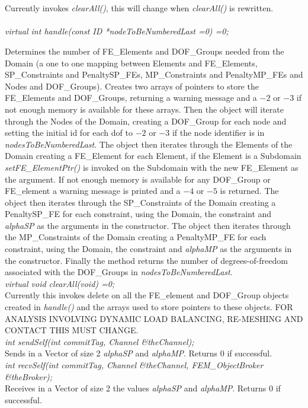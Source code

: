  \\
\\ 
Currently invokes {\em clearAll()}, this will change when {\em
clearAll()} is rewritten. \\

\\
{\em virtual int handle(const ID *nodeToBeNumberedLast =0) =0;} 

Determines the number of FE\_Elements and DOF\_Groups needed from the
Domain (a one to one mapping between Elements and FE\_Elements,
SP\_Constraints and PenaltySP\_FEs, MP\_Constraints and PenaltyMP\_FEs and
Nodes and DOF\_Groups). Creates two arrays of pointers to store the
FE\_Elements and DOF\_Groups, returning a warning message and a $-2$
or $-3$ if not enough memory is available for these arrays. Then the
object will iterate through the Nodes of the Domain, creating a
DOF\_Group for each node and setting the initial id for each dof to
$-2$ or $-3$ if the node identifier is in {\em
nodesToBeNumberedLast}. The object then iterates through the Elements
of the Domain creating a FE\_Element for each Element, if the Element
is a Subdomain {\em setFE\_ElementPtr()} is invoked on the Subdomain
with the new FE\_Element as the argument. If not enough memory is
available for any DOF\_Group or FE\_element a warning message is
printed and a $-4$ or $-5$ is returned. 
The object then iterates through the SP\_Constraints
of the Domain creating a PenaltySP\_FE for each constraint, using the
Domain, the constraint and {\em alphaSP} as the arguments in the
constructor.
The object then iterates through the MP\_Constraints
of the Domain creating a PenaltyMP\_FE for each constraint, using the
Domain, the constraint and {\em alphaMP} as the arguments in the constructor.
Finally the method returns the
number of degrees-of-freedom associated with the DOF\_Groups in {\em
nodesToBeNumberedLast}. \\

{\em virtual void clearAll(void) =0;} \\
Currently this invokes delete on all the FE\_element and DOF\_Group
objects created in {\em handle()} and the arrays used to store
pointers to these objects. FOR ANALYSIS INVOLVING DYNAMIC LOAD
BALANCING, RE-MESHING AND CONTACT THIS MUST CHANGE. \\

{\em int sendSelf(int commitTag, Channel \&theChannel); } \\
Sends in a Vector of size 2 {\em alphaSP} and {\em alphaMP}. Returns
$0$ if successful. \\

{\em int recvSelf(int commitTag, Channel \&theChannel, FEM\_ObjectBroker
\&theBroker); } \\
Receives in a Vector of size 2 the values {\em alphaSP} and {\em
alphaMP}. Returns $0$ if successful. 
